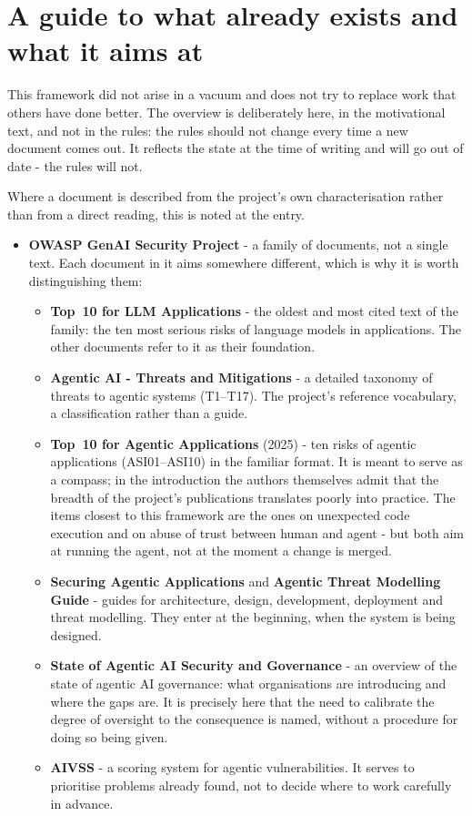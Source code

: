 \section{A guide to what already exists and what it aims at}

This framework did not arise in a vacuum and does not try to replace work that others have done better.
The overview is deliberately here, in the motivational text, and not in the rules: the rules should not change every time a new document comes out.
It reflects the state at the time of writing and will go out of date - the rules will not.

Where a document is described from the project's own characterisation rather than from a direct reading, this is noted at the entry.

\begin{itemize}
\item \textbf{OWASP GenAI Security Project} - a family of documents, not a single text.
Each document in it aims somewhere different, which is why it is worth distinguishing them:
  \begin{itemize}
  \item \textbf{Top~10 for LLM Applications} - the oldest and most cited text of the family: the ten most serious risks of language models in applications. The other documents refer to it as their foundation.
  \item \textbf{Agentic AI - Threats and Mitigations} - a detailed taxonomy of threats to agentic systems (T1--T17). The project's reference vocabulary, a classification rather than a guide.
  \item \textbf{Top~10 for Agentic Applications} (2025) - ten risks of agentic applications (ASI01--ASI10) in the familiar format. It is meant to serve as a compass; in the introduction the authors themselves admit that the breadth of the project's publications translates poorly into practice. The items closest to this framework are the ones on unexpected code execution and on abuse of trust between human and agent - but both aim at running the agent, not at the moment a change is merged.
  \item \textbf{Securing Agentic Applications} and \textbf{Agentic Threat Modelling Guide} - guides for architecture, design, development, deployment and threat modelling. They enter at the beginning, when the system is being designed.
  \item \textbf{State of Agentic AI Security and Governance} - an overview of the state of agentic AI governance: what organisations are introducing and where the gaps are. It is precisely here that the need to calibrate the degree of oversight to the consequence is named, without a procedure for doing so being given.
  \item \textbf{AIVSS} - a scoring system for agentic vulnerabilities. It serves to prioritise problems already found, not to decide where to work carefully in advance.
  \end{itemize}


\end{itemize}

